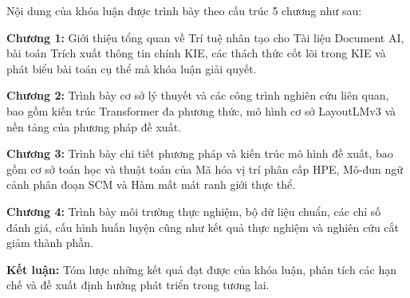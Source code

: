 Nội dung của khóa luận được trình bày theo cấu trúc 5 chương như sau:

\textbf{Chương 1:} Giới thiệu tổng quan về Trí tuệ nhân tạo cho Tài liệu Document AI, bài toán Trích xuất thông tin chính KIE, các thách thức cốt lõi trong KIE và phát biểu bài toán cụ thể mà khóa luận giải quyết.

\textbf{Chương 2:} Trình bày cơ sở lý thuyết và các công trình nghiên cứu liên quan, bao gồm kiến trúc Transformer đa phương thức, mô hình cơ sở LayoutLMv3 và nền tảng của phương pháp đề xuất.

\textbf{Chương 3:} Trình bày chi tiết phương pháp và kiến trúc mô hình đề xuất, bao gồm cơ sở toán học và thuật toán của Mã hóa vị trí phân cấp HPE, Mô-đun ngữ cảnh phân đoạn SCM và Hàm mất mát ranh giới thực thể.

\textbf{Chương 4:} Trình bày môi trường thực nghiệm, bộ dữ liệu chuẩn, các chỉ số đánh giá, cấu hình huấn luyện cũng như kết quả thực nghiệm và nghiên cứu cắt giảm thành phần.

\textbf{Kết luận:} Tóm lược những kết quả đạt được của khóa luận, phân tích các hạn chế và đề xuất định hướng phát triển trong tương lai.

